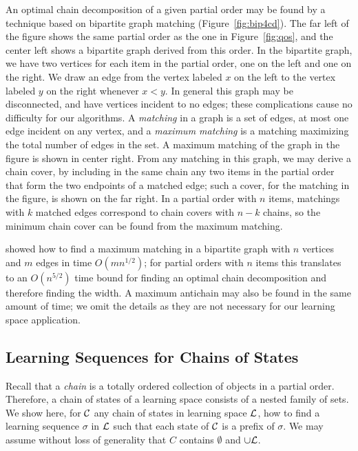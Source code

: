 \documentclass[11pt]{llncs}
\begin{document}
{An optimal chain decomposition of a given partial order may be found by a technique based on bipartite graph matching (Figure~\ref{fig:bip4cd}).
The far left of the figure shows the same partial order as the one in Figure~\ref{fig:qos}, and the center left shows a bipartite graph derived from this order. In the bipartite graph, we have two vertices for each item in the partial order, one on the left and one on the right. We draw an edge from the vertex labeled $x$ on the left to the vertex labeled $y$ on the right whenever $x<y$. In general this graph may be disconnected, and have vertices incident to no edges; these complications cause no difficulty for our algorithms.
A \emph{matching} in a graph is a set of edges, at most one edge incident on any vertex, and a \emph{maximum matching} is a matching maximizing the total number of edges in the set.
A maximum matching of the graph in the figure is shown in center right.
From any matching in this graph, we may derive a chain cover, by including in the same chain any two items in the partial order that form the two endpoints of a matched edge; such a cover, for the matching in the figure, is shown on the far right. In a partial order with $n$ items, matchings with $k$ matched edges correspond to chain covers with $n-k$ chains, so the minimum chain cover can be found from the maximum matching.

\citet{HopKar-SJC-73} showed how to find a maximum matching in a bipartite graph with $n$ vertices and $m$ edges in time $O(mn^{1/2})$; for partial orders with $n$ items this translates to an $O(n^{5/2})$ time bound for finding an optimal chain decomposition and therefore finding the width. A maximum antichain may also be found in the same amount of time; we omit the details as they are not necessary for our learning space application.

\subsection{Learning Sequences for Chains of States}

Recall that a \emph{chain} is a totally ordered collection of objects in a partial order.
Therefore, a chain of states of a learning space consists of a nested family of sets.
We show here, for $\cal C$ any chain of states in learning space $\cal L$,
how to find a learning sequence $\sigma$ in $\cal L$ such that each state of $\cal C$
is a prefix of $\sigma$. We may assume without loss of generality that $C$ contains $\emptyset$ and $\cup\cal L$.

}
\end{document}
